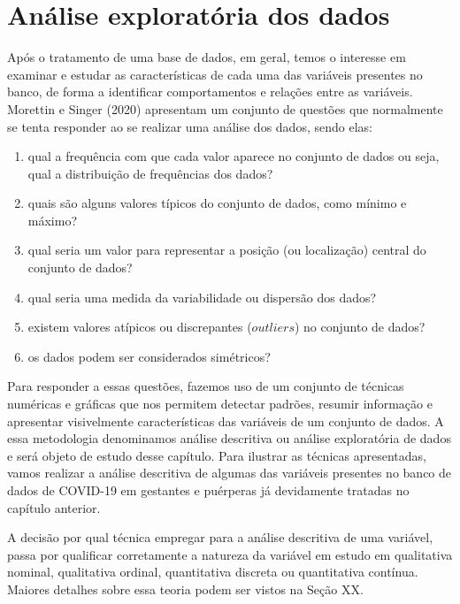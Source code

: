 \documentclass[
  letterpaper,
  DIV=11,
  numbers=noendperiod]{scrreprt}
\begin{document}

\hypertarget{anuxe1lise-exploratuxf3ria-dos-dados}{%
\chapter{Análise exploratória dos
dados}\label{anuxe1lise-exploratuxf3ria-dos-dados}}

Após o tratamento de uma base de dados, em geral, temos o interesse em
examinar e estudar as características de cada uma das variáveis
presentes no banco, de forma a identificar comportamentos e relações
entre as variáveis. Morettin e Singer (2020) apresentam um conjunto de
questões que normalmente se tenta responder ao se realizar uma análise
dos dados, sendo elas:

\begin{enumerate}
\def\labelenumi{\roman{enumi}.}
\item
  qual a frequência com que cada valor aparece no conjunto de dados ou
  seja, qual a distribuição de frequências dos dados?
\item
  quais são alguns valores típicos do conjunto de dados, como mínimo e
  máximo?
\item
  qual seria um valor para representar a posição (ou localização)
  central do conjunto de dados?
\item
  qual seria uma medida da variabilidade ou dispersão dos dados?
\item
  existem valores atípicos ou discrepantes (\(outliers\)) no conjunto de
  dados?
\item
  os dados podem ser considerados simétricos?
\end{enumerate}

Para responder a essas questões, fazemos uso de um conjunto de técnicas
numéricas e gráficas que nos permitem detectar padrões, resumir
informação e apresentar visivelmente características das variáveis de um
conjunto de dados. A essa metodologia denominamos análise descritiva ou
análise exploratória de dados e será objeto de estudo desse capítulo.
Para ilustrar as técnicas apresentadas, vamos realizar a análise
descritiva de algumas das variáveis presentes no banco de dados de
COVID-19 em gestantes e puérperas já devidamente tratadas no capítulo
anterior.

A decisão por qual técnica empregar para a análise descritiva de uma
variável, passa por qualificar corretamente a natureza da variável em
estudo em qualitativa nominal, qualitativa ordinal, quantitativa
discreta ou quantitativa contínua. Maiores detalhes sobre essa teoria
podem ser vistos na Seção XX.
\end{document}
